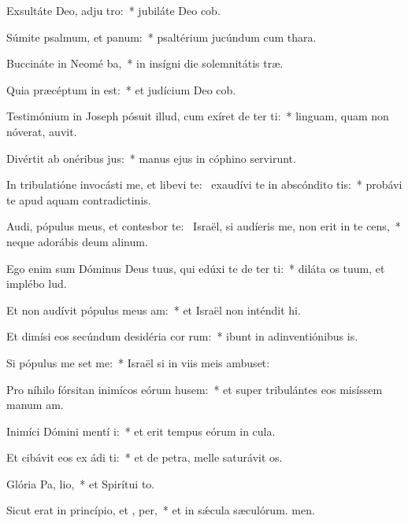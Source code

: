 \item Exsultáte Deo, adju tro:~* jubiláte Deo cob.
\item Súmite psalmum, et  panum:~* psaltérium jucúndum cum thara.
\item Buccináte in Neomé ba,~* in insígni die solemnitátis træ.
\item Quia præcéptum in  est:~* et judícium Deo cob.
\item Testimónium in Joseph pósuit illud, cum exíret de ter ti:~* linguam, quam non nóverat, auvit.
\item Divértit ab onéribus  jus:~* manus ejus in cóphino servirunt.
\item In tribulatióne invocásti me, et libevi te:~\pscross{} exaudívi te in abscóndito tis:~* probávi te apud aquam contradictinis.
\item Audi, pópulus meus, et contesbor te:~\pscross{} Israël, si audíeris me, non erit in te  cens,~* neque adorábis deum alinum.
\item Ego enim sum Dóminus Deus tuus, qui edúxi te de ter ti:~* diláta os tuum, et implébo lud.
\item Et non audívit pópulus meus  am:~* et Israël non inténdit hi.
\item Et dimísi eos secúndum desidéria cor rum:~* ibunt in adinventiónibus is.
\item Si pópulus me set me:~* Israël si in viis meis ambuset:
\item Pro níhilo fórsitan inimícos eórum husem:~* et super tribulántes eos misíssem manum am.
\item Inimíci Dómini mentí  i:~* et erit tempus eórum in cula.
\item Et cibávit eos ex ádi ti:~* et de petra, melle saturávit os.
\item Glória Pa,  lio,~* et Spirítui to.
\item Sicut erat in princípio, et ,  per,~* et in sǽcula sæculórum. men.
